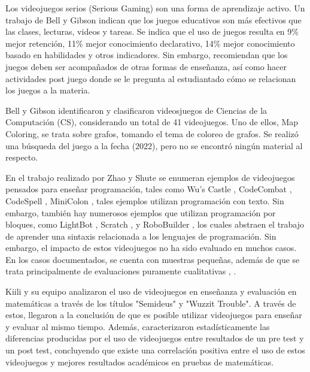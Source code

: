 \documentclass[submission]{eptcs}
\begin{document}
Los videojuegos serios (Serious Gaming) son una forma de aprendizaje activo. Un trabajo de Bell y Gibson \cite{evaluation_of_games_for_teaching_cs} indican que los juegos
educativos son más efectivos que las clases, lecturas, videos y tareas. Se indica que el uso de juegos resulta en 9\% mejor retención, 11\% mejor conocimiento declarativo,
14\% mejor conocimiento basado en habilidades y otros indicadores. Sin embargo, recomiendan que los juegos deben ser acompañados
de otras formas de enseñanza, así como hacer actividades post juego donde se le pregunta al estudiantado cómo se relacionan los juegos a la materia.

Bell y Gibson \cite{evaluation_of_games_for_teaching_cs} identificaron y clasificaron videosjuegos de Ciencias de la Computación (CS),
considerando un total de 41 videojuegos. Uno de ellos, Map Coloring, se trata sobre grafos, tomando el tema de coloreo de grafos.
Se realizó una búsqueda del juego a la fecha (2022), pero no se encontró ningún material al respecto.

En el trabajo realizado por Zhao y Shute \cite{video_game_foster_computational_thinking} se enumeran ejemplos de videojuegos pensados para enseñar programación,
tales como Wu's Castle \cite{wuscastle}, CodeCombat \cite{CodeCombat}, CodeSpell \cite{codespells}, MiniColon \cite{minicolon},
tales ejemplos utilizan programación con texto. Sin embargo, también hay numerosos ejemplos que utilizan programación por
bloques, como LightBot \cite{LightBot}, Scratch \cite{maloney2010scratch}, \cite{scratch} y RoboBuilder \cite{RoboBuilder}, los
cuales abstraen el trabajo de aprender una sintaxis relacionada a los lenguajes de programación.
Sin embargo, el impacto de estos videojuegos no ha sido evaluado en muchos casos. En los casos documentados, se cuenta con
muestras pequeñas, además de que se trata principalmente de evaluaciones puramente cualitativas \cite{video_game_foster_computational_thinking},
\cite{effectiveness_gbl}.

Kiili y su equipo \cite{using_videogames_maths} analizaron el uso de videojuegos en enseñanza
y evaluación en matemáticas a través de los títulos "Semideus" y "Wuzzit Trouble". A través
de estos, llegaron a la conclusión de que es posible utilizar videojuegos para enseñar y
evaluar al mismo tiempo. Además, caracterizaron estadísticamente las diferencias producidas por el uso
de videojuegos entre resultados de un pre test y un post test, concluyendo que existe una correlación positiva
entre el uso de estos videojuegos y mejores resultados académicos en pruebas de matemáticas.
\end{document}
